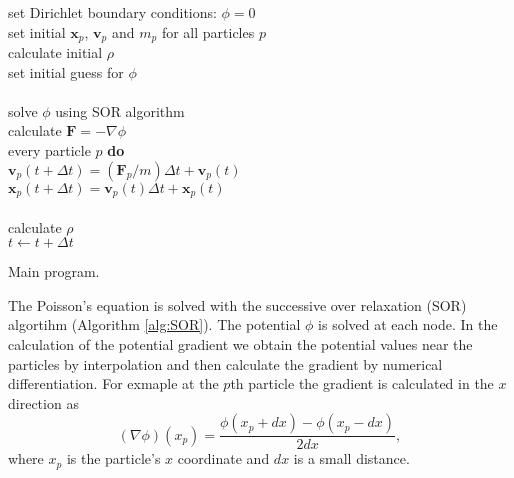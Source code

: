 \documentclass[notitlepage, 12pt]{article}
\begin{document}
\begin{algorithm}[H]
\hspace{0.1\textwidth}\parbox{.8\textwidth}{
\-\hspace{0ex}set Dirichlet boundary conditions: $\phi=0$\\
\-\hspace{0ex}set initial $\mathbf{x}_p$, $\mathbf{v}_p$ and $m_p$ for all particles $p$\\
\-\hspace{0ex}calculate initial $\rho$\\
\-\hspace{0ex}set initial guess for $\phi$\\
\-\hspace{0ex}{\bf loop}\\
\-\hspace{4ex}solve $\phi$ using SOR algorithm\\
\-\hspace{4ex}calculate $\mathbf{F}=-\nabla \phi$\\
\-\hspace{4ex}{\bf for} every particle $p$ {\bf do}\\
\-\hspace{8ex}$\mathbf{v}_p(t+\Delta t) = (\mathbf{F}_p/m)\Delta t + \mathbf{v}_p(t)$\\
\-\hspace{8ex}$\mathbf{x}_p(t+\Delta t) = \mathbf{v}_p(t)\Delta t + \mathbf{x}_p(t)$\\
\-\hspace{4ex}{\bf end for}\\
\-\hspace{4ex}calculate $\rho$\\
\-\hspace{4ex}$t\leftarrow t+\Delta t$\\
\-\hspace{0ex}{\bf end loop}}
\caption{Main program.}
\label{alg:main}
\end{algorithm}

The Poisson's equation is solved with the successive over relaxation (SOR) algortihm (Algorithm \ref{alg:SOR}). The potential $\phi$ is solved at each node. In the calculation of the potential gradient we obtain the potential values near the particles by interpolation and then calculate the gradient by numerical differentiation. For exmaple at the $p$th particle the gradient is calculated in the $x$ direction as
\begin{equation}
(\nabla \phi)(x_p)=\frac{\phi(x_p+dx)-\phi(x_p-dx)}{2dx},
\end{equation}
where $x_p$ is the particle's $x$ coordinate and $dx$ is a small distance. 
\end{document}
